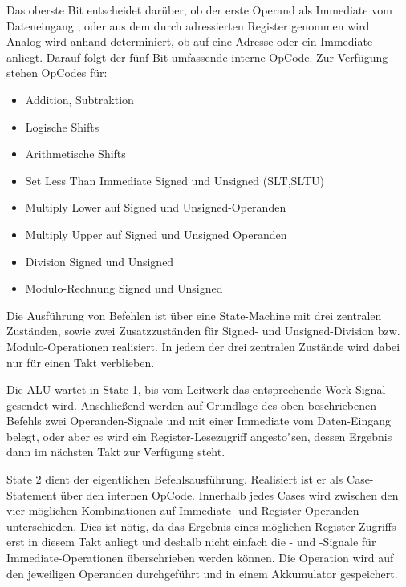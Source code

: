 \vspace{5pt}

Das oberste Bit  entscheidet dar\"uber, ob der erste Operand als Immediate vom Dateneingang , oder aus dem durch  adressierten Register genommen wird.
Analog wird anhand  determiniert, ob auf  eine Adresse oder ein Immediate anliegt.
Darauf folgt der f\"unf Bit umfassende interne OpCode. Zur Verf\"ugung stehen OpCodes f\"ur:

\begin{itemize}
\item Addition, Subtraktion
\item Logische Shifts
\item Arithmetische Shifts
\item Set Less Than Immediate Signed und Unsigned (SLT,SLTU)
\item Multiply Lower auf Signed und Unsigned-Operanden
\item Multiply Upper auf Signed und Unsigned Operanden
\item Division Signed und Unsigned
\item Modulo-Rechnung Signed und Unsigned
\end{itemize}




Die Ausf\"uhrung von Befehlen ist \"uber eine State-Machine mit drei zentralen Zust\"anden, sowie zwei Zusatzzust\"anden f\"ur Signed- und Unsigned-Division bzw. Modulo-Operationen realisiert. In jedem der drei zentralen Zust\"ande wird dabei nur f\"ur einen Takt verblieben.


Die ALU wartet in State 1, bis vom Leitwerk das entsprechende Work-Signal gesendet wird.
Anschlie\ss{}end werden auf Grundlage des oben beschriebenen Befehls zwei Operanden-Signale  und  mit einer Immediate vom Daten-Eingang belegt, oder aber es wird ein Register-Lesezugriff angesto"sen, dessen Ergebnis dann im n\"achsten Takt zur Verf\"ugung steht.


State 2 dient der eigentlichen Befehlsausf\"uhrung. Realisiert ist er als Case-Statement \"uber den internen OpCode. Innerhalb jedes Cases wird zwischen den vier m\"oglichen Kombinationen auf Immediate- und Register-Operanden unterschieden.
Dies ist n\"otig, da das Ergebnis eines m\"oglichen Register-Zugriffs erst in diesem Takt anliegt und deshalb nicht einfach die - und -Signale f\"ur Immediate-Operationen \"uberschrieben werden k\"onnen.
Die Operation wird auf den jeweiligen Operanden durchgef\"uhrt und in einem Akkumulator gespeichert.\vspace{10pt}


